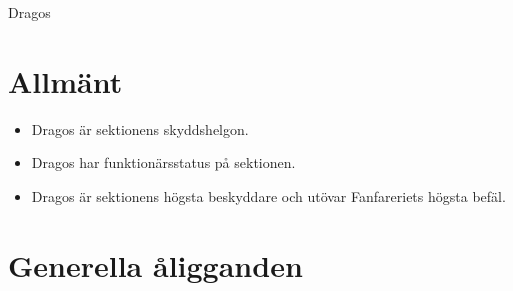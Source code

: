 \documentclass[a4paper]{article}
\begin{document}
\renewcommand{\forening}{Dragos} %

\begin{foreningenv}{\forening{}} %
    \section{Allmänt}
    \begin{itemize}
        \item Dragos är sektionens skyddshelgon.
        \item Dragos har funktionärsstatus på sektionen.
        \item Dragos är sektionens högsta beskyddare och utövar Fanfareriets högsta befäl.
    \end{itemize}
    
    \section{Generella åligganden}
    \aliggsektfunkt{} %
\end{foreningenv}
\end{document}

